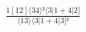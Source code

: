 \documentclass[varwidth, border=5pt]{standalone}
\begin{document}
\begin{my}
$\begin{gathered}
\scriptscriptstyle\frac{1[12]⟨34⟩²⟨3|1+4|2]}{⟨13⟩⟨3|1+4|3]²}
\end{gathered}$
\end{my}
\end{document}
